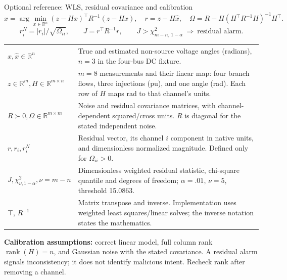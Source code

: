 \begin{frame}[t]{Optional reference: WLS, residual covariance and calibration}
\[
\hat x=\arg\min_{x\in\mathbb R^n}(z-Hx)^\top R^{-1}(z-Hx),\quad r=z-H\hat x,
\quad\Omega=R-H(H^\top R^{-1}H)^{-1}H^\top.
\]
\[
r_i^N=|r_i|/\sqrt{\Omega_{ii}},\qquad J=r^\top R^{-1}r,\qquad
J>\chi^2_{m-n,\,1-\alpha}\ \Longrightarrow\ \text{residual alarm}.
\]
\begin{tabular}{@{}>{\raggedright\arraybackslash}p{.23\linewidth}>{\raggedright\arraybackslash}p{.70\linewidth}@{}}
$x,\hat x\in\mathbb R^n$ & True and estimated non-source voltage angles (radians), $n=3$ in the four-bus DC fixture. \\
$z\in\mathbb R^m,H\in\mathbb R^{m\times n}$ & $m=8$ measurements and their linear map: four branch flows, three injections (pu), and one angle (rad). Each row of $H$ maps rad to that channel's units. \\
$R\succ0,\Omega\in\mathbb R^{m\times m}$ & Noise and residual covariance matrices, with channel-dependent squared/cross units. $R$ is diagonal for the stated independent noise. \\
$r,r_i,r_i^N$ & Residual vector, its channel $i$ component in native units, and dimensionless normalized magnitude. Defined only for $\Omega_{ii}>0$. \\
$J,\chi^2_{\nu,1-\alpha},\nu=m-n$ & Dimensionless weighted residual statistic, chi-square quantile and degrees of freedom; $\alpha=.01$, $\nu=5$, threshold 15.0863. \\
$\top$, $R^{-1}$ & Matrix transpose and inverse. Implementation uses weighted least squares/linear solves; the inverse notation states the mathematics. \\
\end{tabular}
\par\smallskip\textbf{Calibration assumptions:} correct linear model, full column rank $\operatorname{rank}(H)=n$, and Gaussian noise with the stated covariance. A residual alarm signals inconsistency; it does not identify malicious intent. Recheck rank after removing a channel.
\end{frame}

